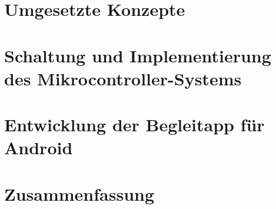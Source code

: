 \documentclass[a4paper, 11pt, titlepage, bibliography=totocnumbered]{scrartcl}
\begin{document}
\newpage
\section{Umgesetzte Konzepte}


\newpage
\section{Schaltung und Implementierung des Mikrocontroller-Systems}


\newpage
\section{Entwicklung der Begleitapp für Android}


\newpage
\section{Zusammenfassung}


\newpage

\end{document}
